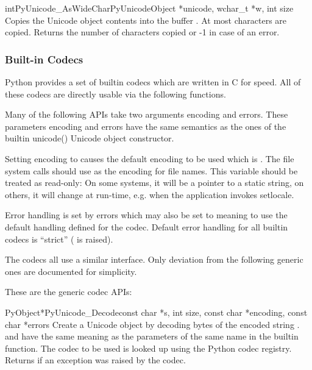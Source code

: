 \begin{cfuncdesc}{int}{PyUnicode_AsWideChar}{PyUnicodeObject *unicode,
                                             wchar_t *w,
                                             int size}
  Copies the Unicode object contents into the  buffer
  .  At most   characters are copied.
  Returns the number of  characters copied or -1 in
  case of an error.
\end{cfuncdesc}


\subsubsection{Built-in Codecs \label{builtinCodecs}}

Python provides a set of builtin codecs which are written in C
for speed. All of these codecs are directly usable via the
following functions.

Many of the following APIs take two arguments encoding and
errors. These parameters encoding and errors have the same semantics
as the ones of the builtin unicode() Unicode object constructor.

Setting encoding to \NULL{} causes the default encoding to be used
which is \ASCII.  The file system calls should use
 as the encoding for file
names. This variable should be treated as read-only: On some systems,
it will be a pointer to a static string, on others, it will change at
run-time, e.g. when the application invokes setlocale.

Error handling is set by errors which may also be set to \NULL{}
meaning to use the default handling defined for the codec.  Default
error handling for all builtin codecs is ``strict''
( is raised).

The codecs all use a similar interface.  Only deviation from the
following generic ones are documented for simplicity.


These are the generic codec APIs:

\begin{cfuncdesc}{PyObject*}{PyUnicode_Decode}{const char *s,
                                               int size,
                                               const char *encoding,
                                               const char *errors}
  Create a Unicode object by decoding  bytes of the encoded
  string .   and  have the same
  meaning as the parameters of the same name in the
   builtin function.  The codec to be used is
  looked up using the Python codec registry.  Returns \NULL{} if an
  exception was raised by the codec.
\end{cfuncdesc}

